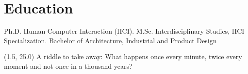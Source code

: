 \documentclass[full]{rvca}
\begin{document}
\section{Education}

Ph.D. Human Computer Interaction (HCI).
M.Sc. Interdisciplinary Studies, HCI Specialization.
Bachelor of Architecture, Industrial and Product Design

\begin{textblock}{3.5}(1.5, 25.0)
\footnotesize \centering A riddle to take away: What happens once every minute, twice every moment and not once in a thousand years?
\end{textblock}
\end{document}
